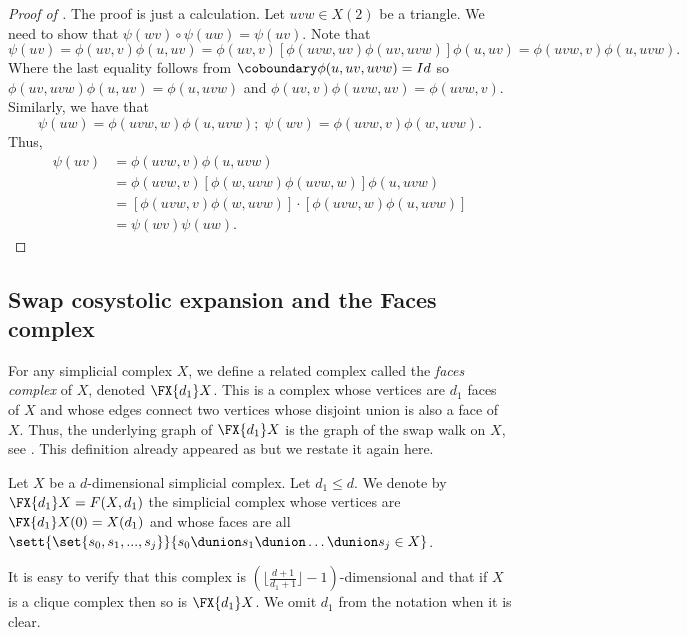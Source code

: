 \begin{corollary}
\end{corollary}

\begin{proof}[Proof of ]
    The proof is just a calculation. Let \(uvw \in X(2)\) be a triangle. We need to show that \(\psi(wv)\circ \psi(uw)=\psi(uv)\). Note that
    \[\psi(uv)=\phi(uv,v)\phi(u,uv) = \phi(uv,v)\left [\phi(uvw,uv) \phi(uv,uvw) \right ] \phi(u,uv) = \phi(uvw,v)\phi(u,uvw).\]
    Where the last equality follows from \(\coboundary \phi(u,uv,uvw)=Id\) so \(\phi(uv,uvw) \phi(u,uv)=\phi(u,uvw)\) and \(\phi(uv,v)\phi(uvw,uv)=\phi(uvw,v)\).
    Similarly, we have that 
    \begin{equation}
        \psi(uw)=\phi(uvw,w)\phi(u,uvw); \; \psi(wv)=\phi(uvw,v)\phi(w,uvw).
    \end{equation}
    Thus,
    \begin{align*}
        \psi(uv) &= \phi(uvw,v)\phi(u,uvw)\\
        &=\phi(uvw,v)\left [ \phi(w,uvw) \phi(uvw,w) \right ]\phi(u,uvw)\\
        &=\left [\phi(uvw,v) \phi(w,uvw)\right ]\cdot  \left [\phi(uvw,w) \phi(u,uvw)\right ] \\
        &= \psi(wv)\psi(uw).
    \end{align*}
\end{proof}

\subsection{Swap cosystolic expansion and the Faces complex}
For any simplicial complex $X$, we define a related complex called the {\em faces complex} of $X$, denoted $\FX{d_1}X$. This is a complex whose vertices are $d_1$ faces of $X$ and whose edges connect two vertices whose disjoint union is also a face of $X$. Thus, the underlying graph of $\FX{d_1}X$ is the graph of the swap walk on $X$, see \cite{AlevFT2019,DiksteinD2019}. This definition already appeared as  but we restate it again here.

\begin{definition} \label{def:face-complex}
    Let \(X\) be a \(d\)-dimensional simplicial complex. Let \(d_1 \leq d\). We denote by \(\FX{d_1}X=F(X,d_1)\) the simplicial complex whose vertices are \(\FX{d_1}X(0)=X(d_1)\) and whose faces are all \(\sett{\set{s_0,s_1,...,s_j}}{s_0\dunion s_1 \dunion \dots \dunion s_j \in X}\). 
\end{definition}
It is easy to verify that this complex is \(\left ( \lfloor \frac{d+1}{d_1+1} \rfloor - 1 \right )\)-dimensional and that if \(X\) is a clique complex then so is \(\FX{d_1}X\). We omit \(d_1\) from the notation when it is clear. 

